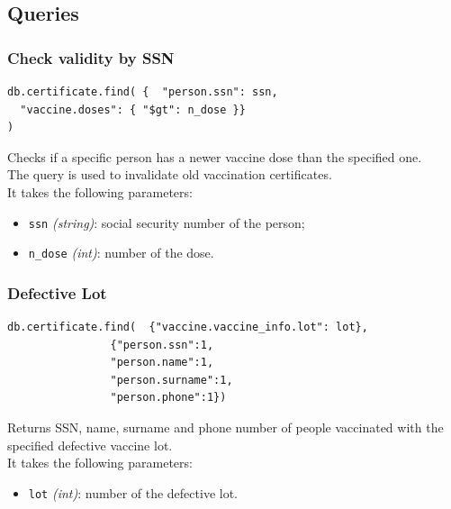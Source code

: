 \documentclass[12pt, a4paper]{article}
\begin{document}
\subsection{Queries}

\subsubsection{Check validity by SSN}
\begin{tcolorbox}[fontupper=\scriptsize]
    \begin{verbatim}
db.certificate.find( {  "person.ssn": ssn,
  "vaccine.doses": { "$gt": n_dose }}
)
    \end{verbatim}
\end{tcolorbox}

\noindent %
Checks if a specific person has a newer vaccine dose than the specified one. \\
The query is used to invalidate old vaccination certificates. \\
It takes the following parameters:
\begin{itemize}
    \item \texttt{ssn} \emph{(string)}: social security number of the person;
    \item \texttt{n\_dose} \emph{(int)}: number of the dose.
\end{itemize}
		
\subsubsection{Defective Lot}
\begin{tcolorbox}[fontupper=\scriptsize]
    \begin{verbatim}
db.certificate.find(  {"vaccine.vaccine_info.lot": lot},
				{"person.ssn":1,
				"person.name":1,
				"person.surname":1,
				"person.phone":1})
    \end{verbatim}
\end{tcolorbox}

\noindent %
Returns SSN, name, surname and phone number of people vaccinated with the specified 
defective vaccine lot. \\
It takes the following parameters:
\begin{itemize}
    \item \texttt{lot} \emph{(int)}: number of the defective lot.
\end{itemize}
\end{document}
